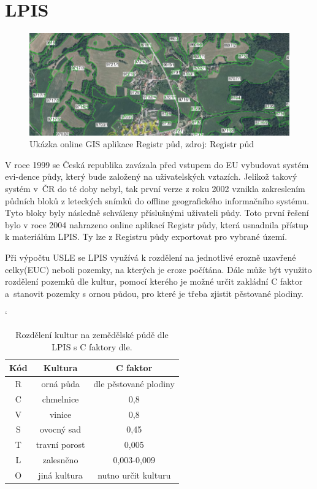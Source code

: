 \section{LPIS}
\label{3-lpis}
\begin{figure}[H]
    \centering \includegraphics[scale=0.7]{./pictures/lpis.png}
      \caption[Ukázka GIS online aplikace Registr půd]{Ukázka online
        GIS aplikace Registr půd, zdroj: Registr půd\cite{lpis}}
      \label{fig:lpis}
\end{figure}
V roce 1999 se Česká republika zavázala před vstupem do EU vybudovat
systém evi-dence půdy, který bude založený na uživatelských
vztazích. Jelikož takový systém v~ČR do té doby nebyl, tak první verze
z roku 2002 vznikla zakreslením půdních bloků z leteckých snímků do
offline geografického informačního systému. Tyto bloky byly následně
schváleny příslušnými uživateli půdy. Toto první řešení bylo v roce
2004 nahrazeno online aplikací Registr půdy\cite{lpis}, která
usnadnila přístup k materiálům LPIS. Ty lze z Registru půdy exportovat
pro vybrané území.\cite{lpis}

Při výpočtu USLE se LPIS využívá k rozdělení na jednotlivé erozně
uzavřené celky(EUC) neboli pozemky, na kterých je eroze počítána. Dále
může být využito rozdělení pozemků dle kultur, pomocí kterého je možné
určit zakládní C faktor a~stanovit pozemky s ornou půdou, pro které je
třeba zjistit pěstované plodiny.\cite{Novotny2014}
\begin{table}[!h]
\begin{center}
\catcode`
    \noindent\begin{tabular}{|*{3}{c|}} \hline \bf Kód & \bf Kultura &
    \bf C faktor\\ \hline R & orná půda & dle pěstované
    plodiny\\ \hline C & chmelnice & 0,8\\ \hline V & vinice &
    0,8\\ \hline S & ovocný sad & 0,45\\ \hline T & travní porost &
    0,005\\ \hline L & zalesněno & 0,003-0,009\\ \hline O & jiná
    kultura & nutno určit kulturu\\ \hline
    \end{tabular}\\
  \caption[Rozdělení kultur na zemědělské půdě dle LPIS]{Rozdělení
    kultur na zemědělské půdě dle LPIS\cite{lpis} s C faktory
    dle\cite{janecek2012}.}
  \label{tabulka_c_typ}
\end{center}
\end{table}
\FloatBarrier
